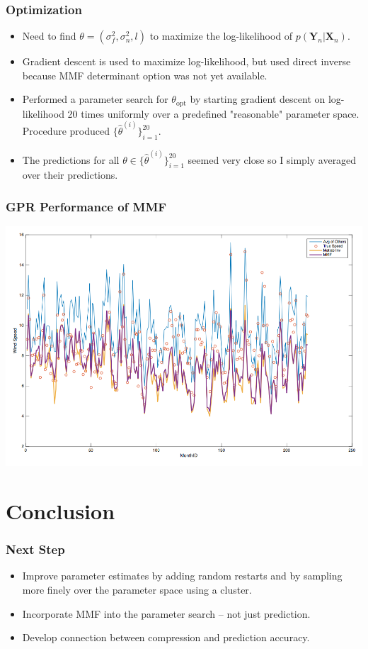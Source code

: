 \documentclass{beamer}
\begin{document}
\begin{frame}
\frametitle{Optimization}
\begin{itemize}
\item Need to find $\theta = (\sigma_f^2, \sigma_n^2, l)$ to maximize the log-likelihood of $p(\textbf{Y}_n|\textbf{X}_n)$.
\item Gradient descent is used to maximize log-likelihood, but used direct inverse because MMF determinant option was not yet available.
\item Performed a parameter search for $\theta_\mathrm{opt}$ by starting gradient descent on log-likelihood 20 times uniformly over a predefined "reasonable" parameter space. Procedure produced $\{\hat \theta^{(i)}\}_{i=1}^{20}$.
\item The predictions for all $\theta\in \{\hat \theta^{(i)}\}_{i=1}^{20}$ seemed very close so I simply averaged over their predictions.
\end{itemize}
\end{frame}

\begin{frame}
\frametitle{GPR Performance of MMF}
\begin{center}
\includegraphics[scale=0.4]{fig2.png}
\end{center}
\end{frame}
\section{Conclusion}
\begin{frame}
\frametitle{Next Step}
\begin{itemize}
\item Improve parameter estimates by adding random restarts and by sampling more finely over the parameter space using a cluster.
\item Incorporate MMF into the parameter search -- not just prediction.
\item Develop connection between compression and prediction accuracy.
\end{itemize}
\end{frame}
\end{document}
